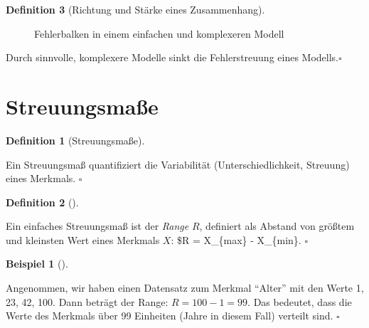\documentclass[
  a4paper,
  DIV=11]{scrreprt}
\theoremstyle{definition}
\theoremstyle{definition}
\newtheorem{example}{Beispiel}[chapter]
\theoremstyle{definition}
\newtheorem{definition}{Definition}[chapter]
\theoremstyle{remark}
\begin{document}
\begin{definition}[Richtung und Stärke eines
Zusammenhang]
\begin{figure}
\begin{minipage}{0.50\linewidth}
\end{minipage}%

\caption{\label{fig-fehler-red}Fehlerbalken in einem einfachen und
komplexeren Modell}

\end{figure}%

\begin{tcolorbox}[enhanced jigsaw, leftrule=.75mm, opacitybacktitle=0.6, colback=white, colframe=quarto-callout-important-color-frame, coltitle=black, colbacktitle=quarto-callout-important-color!10!white, opacityback=0, left=2mm, breakable, titlerule=0mm, toptitle=1mm, bottomtitle=1mm, rightrule=.15mm, title=\textcolor{quarto-callout-important-color}{\faExclamation}\hspace{0.5em}{Wichtig}, arc=.35mm, bottomrule=.15mm, toprule=.15mm]

Durch sinnvolle, komplexere Modelle sinkt die Fehlerstreuung eines
Modells.\(\square\)

\end{tcolorbox}

\section{Streuungsmaße}\label{sec-streuung}

\begin{definition}[Streuungsmaße]\protect\hypertarget{def-streuungsmaße}{}\label{def-streuungsmaße}

Ein Streuungsmaß quantifiziert die Variabilität (Unterschiedlichkeit,
Streuung) eines Merkmals. \(\square\)

\end{definition}

\begin{definition}[]\protect\hypertarget{def-range}{}\label{def-range}

Ein einfaches Streuungsmaß ist der \emph{Range} \(R\), definiert als
Abstand von größtem und kleinsten Wert eines Merkmals \(X\): \$R =
X\_\{max\} - X\_\{min\}. \(\square\)

\end{definition}

\begin{example}[]\protect\hypertarget{exm-range}{}\label{exm-range}

Angenommen, wir haben einen Datensatz zum Merkmal ``Alter'' mit den
Werte 1, 23, 42, 100. Dann beträgt der Range: \(R = 100 - 1 = 99\). Das
bedeutet, dass die Werte des Merkmals über 99 Einheiten (Jahre in diesem
Fall) verteilt sind. \(\square\)


\end{example}
\end{definition}
\end{document}
